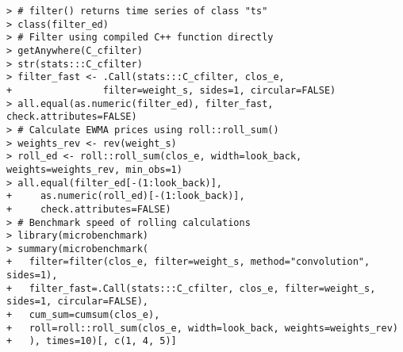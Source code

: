 \documentclass[10pt]{beamer}\usepackage[]{graphicx}\usepackage[]{color}
\makeatletter
\newenvironment{kframe}{%
 \def\at@end@of@kframe{}%
 \ifinner\ifhmode%
  \def\at@end@of@kframe{\end{minipage}}%
  \begin{minipage}{\columnwidth}%
 \fi\fi%
 \def\FrameCommand##1{\hskip\@totalleftmargin \hskip-\fboxsep
 \colorbox{shadecolor}{##1}\hskip-\fboxsep
     \hskip-\linewidth \hskip-\@totalleftmargin \hskip\columnwidth}%
 \MakeFramed {\advance\hsize-\width
   \@totalleftmargin\z@ \linewidth\hsize
   \@setminipage}}%
 {\par\unskip\endMakeFramed%
 \at@end@of@kframe}
\newenvironment{knitrout}{}{} %
\makeatother
\begin{document}
\begin{frame}[fragile,t]{\subsecname}
\begin{block}{}
\begin{columns}[T]
\begin{knitrout}
\begin{kframe}
\begin{verbatim}
> # filter() returns time series of class "ts"
> class(filter_ed)
> # Filter using compiled C++ function directly
> getAnywhere(C_cfilter)
> str(stats:::C_cfilter)
> filter_fast <- .Call(stats:::C_cfilter, clos_e, 
+                filter=weight_s, sides=1, circular=FALSE)
> all.equal(as.numeric(filter_ed), filter_fast, check.attributes=FALSE)
> # Calculate EWMA prices using roll::roll_sum()
> weights_rev <- rev(weight_s)
> roll_ed <- roll::roll_sum(clos_e, width=look_back, weights=weights_rev, min_obs=1)
> all.equal(filter_ed[-(1:look_back)],
+     as.numeric(roll_ed)[-(1:look_back)],
+     check.attributes=FALSE)
> # Benchmark speed of rolling calculations
> library(microbenchmark)
> summary(microbenchmark(
+   filter=filter(clos_e, filter=weight_s, method="convolution", sides=1),
+   filter_fast=.Call(stats:::C_cfilter, clos_e, filter=weight_s, sides=1, circular=FALSE),
+   cum_sum=cumsum(clos_e),
+   roll=roll::roll_sum(clos_e, width=look_back, weights=weights_rev)
+   ), times=10)[, c(1, 4, 5)]
\end{verbatim}
\end{kframe}
\end{knitrout}
  \end{columns}
\end{block}

\end{frame}


\end{document}
